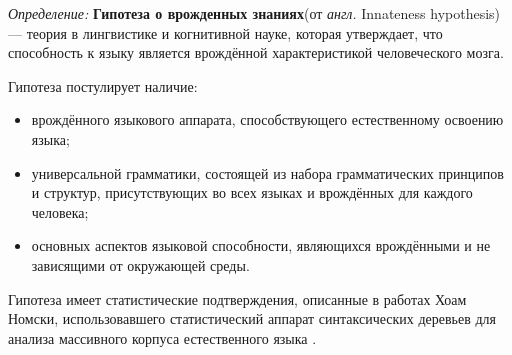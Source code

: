 \textit{Определение:} \textbf{Гипотеза о врожденных знаниях}(от \textit{англ.} Innateness hypothesis) --- теория в лингвистике и когнитивной науке,
 которая утверждает, что способность к языку является врождённой характеристикой человеческого мозга. 

Гипотеза постулирует наличие:
\begin{itemize}
    \item врождённого языкового аппарата, способствующего естественному освоению языка;
    \item универсальной грамматики, состоящей из набора грамматических принципов и структур, присутствующих во всех языках и врождённых для каждого человека;
    \item основных аспектов языковой способности, являющихся врождёнными и не зависящими от окружающей среды.
\end{itemize}

Гипотеза имеет статистические подтверждения, описанные в работах Хоам Номски, использовавшего статистический аппарат синтаксических деревьев 
для анализа массивного корпуса естественного языка \cite{everaert2015structures}\cite{montague1970universal}.




